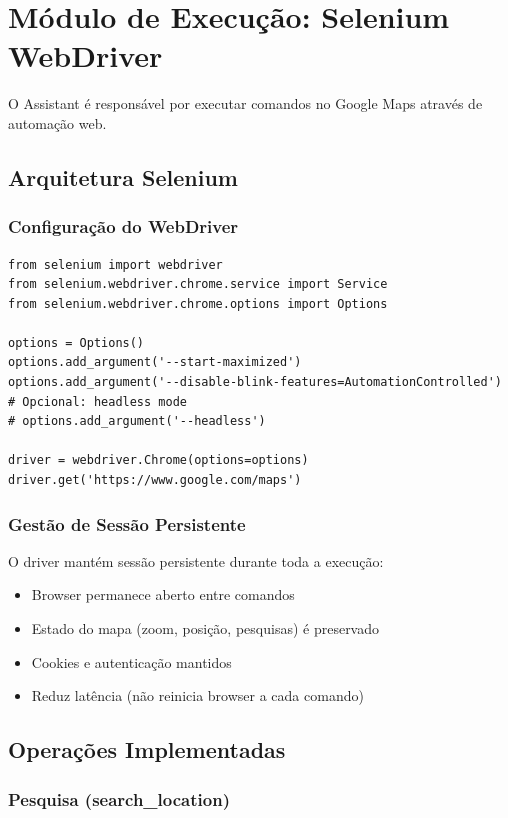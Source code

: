 \section{Módulo de Execução: Selenium WebDriver}

O Assistant é responsável por executar comandos no Google Maps através de automação web.

\subsection{Arquitetura Selenium}

\subsubsection{Configuração do WebDriver}

\begin{verbatim}
from selenium import webdriver
from selenium.webdriver.chrome.service import Service
from selenium.webdriver.chrome.options import Options

options = Options()
options.add_argument('--start-maximized')
options.add_argument('--disable-blink-features=AutomationControlled')
# Opcional: headless mode
# options.add_argument('--headless')

driver = webdriver.Chrome(options=options)
driver.get('https://www.google.com/maps')
\end{verbatim}

\subsubsection{Gestão de Sessão Persistente}

O driver mantém sessão persistente durante toda a execução:
\begin{itemize}
    \item Browser permanece aberto entre comandos
    \item Estado do mapa (zoom, posição, pesquisas) é preservado
    \item Cookies e autenticação mantidos
    \item Reduz latência (não reinicia browser a cada comando)
\end{itemize}

\subsection{Operações Implementadas}

\subsubsection{Pesquisa (search\_location)}

